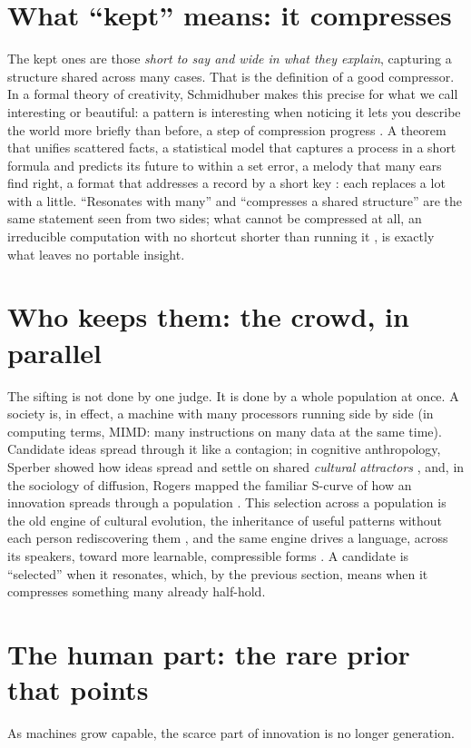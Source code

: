 \documentclass[11pt]{article}
\begin{document}
\section{What ``kept'' means: it compresses}
\label{sec:compress}
The kept ones are those \emph{short to say and wide in what they explain}, capturing a structure
shared across many cases. That is the definition of a good
compressor. In a formal theory of creativity, Schmidhuber makes this precise for what we call interesting or beautiful: a pattern is
interesting when noticing it lets you describe the world more briefly than before, a step of
compression progress \cite{schmidhuber2010}. A theorem that unifies scattered facts, a statistical model that captures a
process in a short formula and predicts its future to within a set error, a melody that
many ears find right, a format that addresses a record by a short key \cite{gavrilov_atree}: each
replaces a lot with a little. ``Resonates with many'' and ``compresses a shared structure'' are the
same statement seen from two sides; what cannot be compressed at all, an irreducible computation with
no shortcut shorter than running it \cite{wolfram2002}, is exactly what leaves no portable insight.

\section{Who keeps them: the crowd, in parallel}
\label{sec:crowd}
The sifting is not done by one judge. It is done by a whole population at once. A society is, in
effect, a machine with many processors running side by side (in computing terms, MIMD: many
instructions on many data at the same time). Candidate ideas spread through it like a contagion;
in cognitive anthropology, Sperber showed how ideas spread and settle on shared \emph{cultural attractors} \cite{sperber1996}, and, in the sociology of diffusion, Rogers mapped the familiar S-curve of how an
innovation spreads through a population \cite{rogers2003}. This selection across a population is the
old engine of cultural evolution, the inheritance of useful patterns without each person
rediscovering them \cite{boyd1985, dawkins1976}, and the same engine drives a language, across its
speakers, toward more learnable, compressible forms \cite{kirby2008}. A candidate is ``selected'' when it resonates,
which, by the previous section, means when it compresses something many already half-hold.

\section{The human part: the rare prior that points}
\label{sec:human}
As machines grow capable, the scarce part of innovation is no longer generation.
\end{document}
